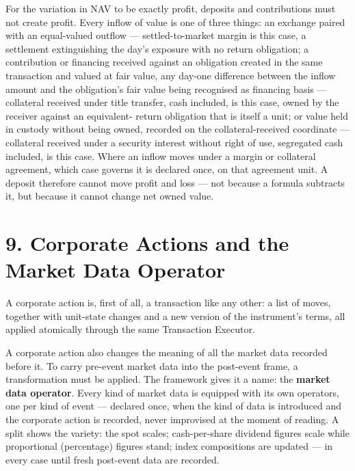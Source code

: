 \documentclass[11pt,a4paper]{article}
\newcommand{\clabel}[1]{\leavevmode\hypertarget{clause-#1}{}%
  \marginpar{\raggedright\scriptsize\ttfamily\textcolor{gray}{#1}}}
\begin{document}
\clabel{C-8.5}For the variation in NAV to be exactly profit, deposits and
contributions must not create profit. Every inflow of value is one of
three things: \clabel{C-8.6}an exchange paired with an equal-valued outflow ---
settled-to-market margin is this case, a settlement extinguishing the
day's exposure with no return obligation; \clabel{C-8.7}a contribution or financing received against an obligation
created in the same transaction and valued at fair value, any day-one
difference between the inflow amount and the obligation's fair value being
recognised as financing basis --- collateral received under title transfer,
cash included, is this case, owned by the receiver against an equivalent-
return obligation that is itself a unit; \clabel{C-8.8}or value held in custody without being owned, recorded on
the collateral-received coordinate --- collateral received under a
security interest without right of use, segregated cash included, is
this case. \clabel{C-8.9}Where an inflow moves under a margin or collateral agreement,
which case governs it is declared once, on that agreement unit. A
deposit therefore cannot move profit
and loss --- not because a formula subtracts it, but because it cannot
change net owned value.

\hypertarget{corporate-actions-and-the-market-data-operator}{%
\section{9. Corporate Actions and the Market Data
Operator}\label{corporate-actions-and-the-market-data-operator}}

\clabel{C-9.1}A corporate action is, first of all, a transaction like any other: a
list of moves, together with unit-state changes and a new version of the
instrument's terms, all applied atomically through the same Transaction
Executor.

\clabel{C-9.2}A corporate action also changes the meaning of all the market data
recorded before it. To carry pre-event market data into the post-event
frame, a transformation must be applied. The framework gives it a name:
the \textbf{market data operator}. Every kind of market data is equipped
with its own operators, one per kind of event --- declared once, when
the kind of data is introduced and the corporate action is recorded,
never improvised at the moment of reading. A split shows the variety:
the spot scales; cash-per-share dividend figures scale while
proportional (percentage) figures stand; index compositions are updated
--- in every case until fresh post-event data are recorded.
\end{document}
